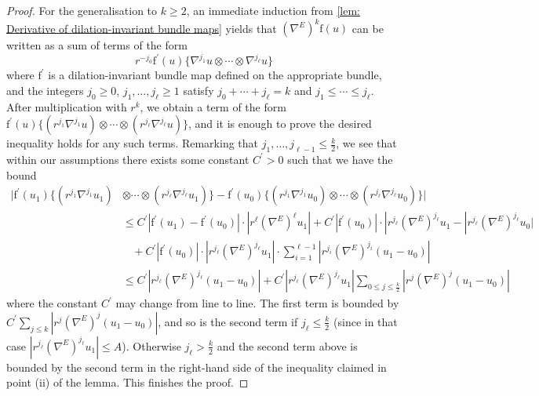 \documentclass{article}
\numberwithin{equation}{section}        %
\theoremstyle{bfnote}
\theoremstyle{definition}
\theoremstyle{bfremark}
\newcommand{\bmap}[1]{\boldsymbol{\mathrm{#1}}}     %
\begin{document}
\begin{proof}
    For the generalisation to $k \geq 2$, an immediate induction from \cref{lem: Derivative of dilation-invariant bundle maps} yields that $(\nabla^E)^k \bmap{f}(u)$ can be written as a sum of terms of the form
    \begin{equation*}
    	r^{-j_0} \bmap{f}^\prime(u) \{ \nabla^{j_1} u \otimes \cdots \otimes \nabla^{j_\ell} u \}
    \end{equation*}
    where $\bmap{f}^\prime$ is a dilation-invariant bundle map defined on the appropriate bundle, and the integers $j_0 \geq 0$, $j_1,\ldots,j_\ell \geq 1$ satisfy $j_0 + \cdots + j_\ell = k$ and $j_1 \leq \cdots \leq j_\ell$. After multiplication with $r^k$, we obtain a term of the form $\bmap{f}^\prime(u) \{ (r^{j_1} \nabla^{j_1} u) \otimes \cdots \otimes (r^{j_\ell} \nabla^{j_\ell} u) \}$, and it is enough to prove the desired inequality holds for any such terms. Remarking that $j_1, \ldots, j_{\ell-1} \leq \frac{k}{2}$, we see that within our assumptions there exists some constant $C^\prime > 0$ such that we have the bound
    \begin{align*}
    	|\bmap{f}^\prime(u_1) \{ (r^{j_1} \nabla^{j_1} u_1) & \otimes \cdots \otimes (r^{j_\ell} \nabla^{j_\ell} u_1) \} - \bmap{f}^\prime(u_0) \{ (r^{j_1} \nabla^{j_1} u_0) \otimes \cdots \otimes (r^{j_\ell} \nabla^{j_\ell} u_0) \}| \\
		& \leq C^\prime |\bmap{f}^\prime(u_1)-\bmap{f}^\prime(u_0)| \cdot |r^\ell (\nabla^E)^\ell u_1| + C^\prime |\bmap{f}^\prime(u_0)| \cdot |r^{j_\ell} (\nabla^E)^{j_\ell} u_1 - |r^{j_\ell} (\nabla^E)^{j_\ell} u_0| \\
		& ~~~~ + C^\prime |\bmap{f}^\prime(u_0)| \cdot |r^{j_\ell} (\nabla^E)^{j_\ell} u_1| \cdot \sum_{i = 1}^{\ell-1} |r^{j_i} (\nabla^E)^{j_i}(u_1-u_0)| \\
		& \leq C^\prime |r^{j_\ell} (\nabla^E)^{j_\ell} (u_1-u_0)| + C^\prime |r^{j_\ell} (\nabla^E)^{j_\ell} u_1| \sum_{0 \leq j \leq \frac{k}{2}} |r^j (\nabla^E)^j(u_1-u_0)|
    \end{align*}
    where the constant $C^\prime$ may change from line to line. The first term is bounded by $C^\prime \sum_{j \leq k} |r^j (\nabla^E)^j(u_1-u_0)|$, and so is the second term if $j_\ell \leq \frac{k}{2}$ (since in that case $|r^{j_\ell} (\nabla^E)^{j_\ell} u_1| \leq A$). Otherwise $j_\ell > \frac{k}{2}$ and the second term above is bounded by the second term in the right-hand side of the inequality claimed in point (ii) of the lemma. This finishes the proof.
\end{proof}
\end{document}
